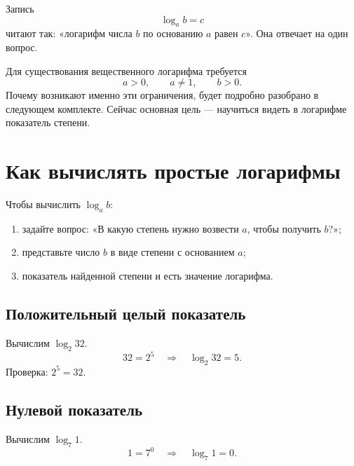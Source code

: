 \logequivalencefigure

\lognotationfigure

Запись
\[
  \log_a b=c
\]
читают так: «логарифм числа \(b\) по основанию \(a\) равен \(c\)».
Она отвечает на один вопрос.

\logquestionfigure

\begin{notebox}
  Для существования вещественного логарифма требуется
  \[
    a>0,\qquad a\ne1,\qquad b>0.
  \]
  Почему возникают именно эти ограничения, будет подробно разобрано в
  следующем комплекте. Сейчас основная цель --- научиться видеть в
  логарифме показатель степени.
\end{notebox}

\section{Как вычислять простые логарифмы}

\begin{methodintro}[Алгоритм]
  Чтобы вычислить \(\log_a b\):
  \begin{enumerate}
    \item задайте вопрос: «В какую степень нужно возвести \(a\), чтобы
      получить \(b\)?»;
    \item представьте число \(b\) в виде степени с основанием \(a\);
    \item показатель найденной степени и есть значение логарифма.
  \end{enumerate}
\end{methodintro}

\subsection{Положительный целый показатель}

\begin{trainingtask}[Пример 1]
  Вычислим \(\log_2 32\).
  \[
    32=2^5
    \quad\Longrightarrow\quad
    \boxed{\log_2 32=5}.
  \]
  Проверка: \(2^5=32\).
\end{trainingtask}

\subsection{Нулевой показатель}

\begin{trainingtask}[Пример 2]
  Вычислим \(\log_7 1\).
  \[
    1=7^0
    \quad\Longrightarrow\quad
    \boxed{\log_7 1=0}.
  \]
\end{trainingtask}

